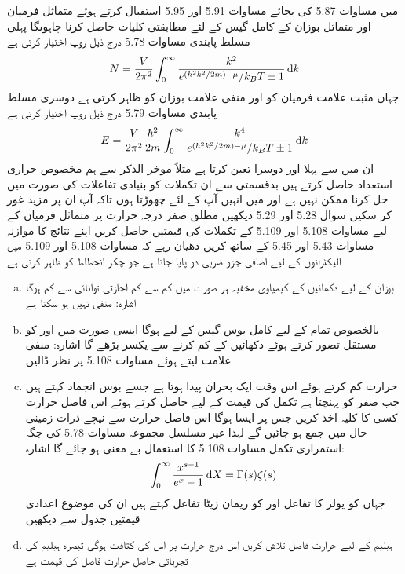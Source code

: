میں مساوات 5.87 کی بجائے مساوات 5.91 اور 5.95 استقبال کرتے ہوئے متماثل فرمیان اور متماثل بوزان کے کامل گیس کے لئے مطابقتی کلیات حاصل کرنا چاہوںگا پہلی مسلط پابندی مساوات 5.78 درج ذیل روپ اختیار کرتی ہے 
\begin{align}
N = \frac{V}{2 \pi^2} \int_0^{\infty} \frac{k^2}{e^{(h^2 k^2 /2m) - \mu} / k_B T \pm 1} \dif k
\end{align}
جہاں مثبت علامت فرمیان کو اور منفی علامت بوزان کو ظاہر  کرتی ہے دوسری مسلط پابندی مساوات 5.79 درج ذیل روپ اختیار کرتی ہے 
\begin{align}
E = \frac{V}{2\pi^2} \frac{\hslash^2}{2m} \int_0^{\infty} \frac{k^4}{e^{(h^2 k^2 /2m) - \mu} / k_B T \pm 1} \dif k
\end{align}
ان میں سے پہلا  اور دوسرا  تعین کرتا ہے مثلاً موخر الذکر سے ہم مخصوص حراری استعداد  حاصل کرتے ہیں بدقسمتی سے ان  تکملات کو بنیادی تفاعلات کی صورت میں حل کرنا ممکن نہیں ہے اور میں انہیں آپ کے لئے چھوڑتا ہوں تاکہ آپ ان پر مزید غور کر سکیں سوال 5.28 اور 5.29 دیکھیں 
مطلق صفر درجہ حرارت پر متماثل فرميان کے لیے مساوات 5.108 اور 5.109 کے تکملات کی قیمتیں حاصل کریں اپنے نتائج کا موازنہ مساوات 5.43 اور 5.45 کے ساتھ کریں دھیان رہے کہ مساوات 5.108 اور 5.109 میں الیکٹرانوں کے لیے اضافی جزو ضربی دو  پایا جاتا ہے جو چکر انحطاط کو ظاہر کرتی ہے 
\begin{enumerate}[a.]
\item
بوزان کے لیے دکھائیں کے کیمیاوی مخفیہ ہر صورت میں کم سے کم اجازتی توانائی سے کم ہوگا اشارہ:  منفی نہیں ہو سکتا ہے 
\item
بالخصوص تمام  کے لیے کامل بوس گیس کے لیے  ہوگا ایسی صورت میں  اور  کو مستقل تصور کرتے ہوئے دکھائیں کے  کم کرنے سے  یکسر بڑھے گا اشارہ: منفی علامت لیتے ہوئے مساوات 5.108 پر نظر ڈالیں
\item
حرارت  کم کرتے ہوئے اس وقت ایک بحران پیدا ہوتا ہے جسے بوس  انجماد  کہتے ہیں جب  صفر کو پہنچتا ہے تکمل کی قیمت  کے لیے حاصل کرتے ہوئے اس فاصل حرارت کسی کا کلیہ اخذ کریں جس پر ایسا ہوگا اس فاصل حرارت سے نیچے ذرات زمینی حال میں جمع ہو جائیں گے لہٰذا غیر مسلسل مجموعہ مساوات 5.78 کی جگہ استمراری تکمل مساوات 5.108 کا استعمال بے معنی ہو جائے گا اشارہ: 
\begin{align} 
\int_0^{\infty} \frac{x^{s - 1}}{e^x - 1} \dif X = \Gamma (s) \zeta(s)
\end{align} 
جہاں  کو  یولر  کا  تفاعل اور  کو ریمان   زیٹا تفاعل کہتے ہیں ان کی موضوع اعدادی قیمتیں  جدول سے دیکھیں 
\item
ہیلیم کے لیے حرارت فاصل تلاش کریں اس درج حرارت پر اس کی کثافت  ہوگی تبصرہ ہیلیم کی تجرباتی حاصل حرارت فاصل کی قیمت  ہے 
\end{enumerate}

